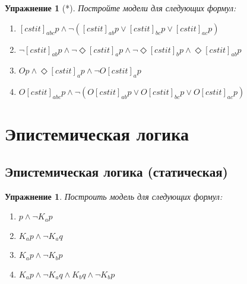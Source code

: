 \documentclass[11pt]{article}
\newtheorem{exercise}[theorem]{Упражнение}
\begin{document}
\begin{exercise}[*]Постройте модели для следующих формул:
\begin{enumerate}
    \item $[cstit]_{abc} p \wedge \neg ([cstit]_{ab} p \vee [cstit]_{bc} p \vee  [cstit]_{ac} p) $
    \item $\neg [cstit]_{ab} p \wedge \neg \Diamond [cstit]_a p \wedge \neg \Diamond [cstit]_b p \wedge \Diamond [cstit]_{ab} p  $
    \item   $Op \wedge \Diamond [cstit]_a p \wedge \neg O[cstit]_a p$
    \item $O [cstit]_{abc} p \wedge \neg (O[cstit]_{ab} p \vee O[cstit]_{bc} p \vee  O[cstit]_{ac} p) $
\end{enumerate}
\end{exercise}


\section{Эпистемическая логика}

\subsection{Эпистемическая логика (статическая)}

\begin{exercise} Построить модель для следующих формул:
\begin{multicols}{2}
\begin{enumerate}
\item $p \wedge \neg K_a p$
\item $K_a p \wedge \neg K_a q$
\item $K_a p \wedge \neg K_b p$
\item $K_a p \wedge \neg K_a q \wedge K_b q \wedge \neg K_b p$
\end{enumerate}
\end{multicols}
\end{exercise}
\end{document}
